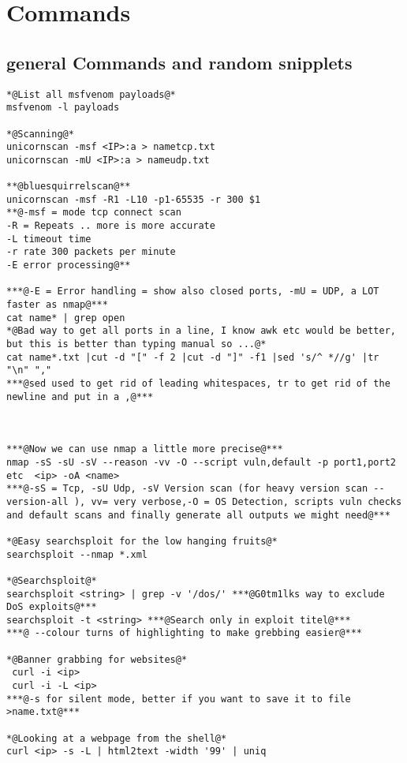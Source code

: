 \documentclass[a4paper,12pt, twoside,]{report}
\begin{document}
\section{Commands}
\subsection{general Commands and random snipplets}
\begin{lstlisting}[caption={commands},label=com]
*@List all msfvenom payloads@*
msfvenom -l payloads

*@Scanning@*
unicornscan -msf <IP>:a > nametcp.txt
unicornscan -mU <IP>:a > nameudp.txt

**@bluesquirrelscan@**
unicornscan -msf -R1 -L10 -p1-65535 -r 300 $1 
**@-msf = mode tcp connect scan
-R = Repeats .. more is more accurate
-L timeout time
-r rate 300 packets per minute
-E error processing@**

***@-E = Error handling = show also closed ports, -mU = UDP, a LOT faster as nmap@***
cat name* | grep open
*@Bad way to get all ports in a line, I know awk etc would be better, but this is better than typing manual so ...@*
cat name*.txt |cut -d "[" -f 2 |cut -d "]" -f1 |sed 's/^ *//g' |tr "\n" ","
***@sed used to get rid of leading whitespaces, tr to get rid of the newline and put in a ,@***



***@Now we can use nmap a little more precise@***
nmap -sS -sU -sV --reason -vv -O --script vuln,default -p port1,port2 etc  <ip> -oA <name>
***@-sS = Tcp, -sU Udp, -sV Version scan (for heavy version scan --version-all ), vv= very verbose,-O = OS Detection, scripts vuln checks and default scans and finally generate all outputs we might need@***

*@Easy searchsploit for the low hanging fruits@*
searchsploit --nmap *.xml

*@Searchsploit@*
searchsploit <string> | grep -v '/dos/' ***@G0tm1lks way to exclude DoS exploits@***
searchsploit -t <string> ***@Search only in exploit titel@***
***@ --colour turns of highlighting to make grebbing easier@***

*@Banner grabbing for websites@*
 curl -i <ip>
 curl -i -L <ip>
***@-s for silent mode, better if you want to save it to file >name.txt@***

*@Looking at a webpage from the shell@*
curl <ip> -s -L | html2text -width '99' | uniq


\end{lstlisting}
\end{document}
